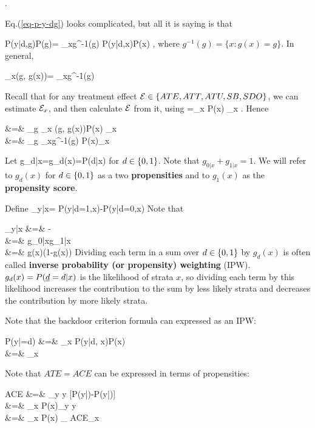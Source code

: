 \beq
{}
\;.
\label{eq-p-y-dg}
\eeq

Eq.(\ref{eq-p-y-dg}) 
looks complicated, but all
it is saying is that

\beq
P(y|d,g)P(g)=
\sum_{x\in g^{-1}(g)}
 P(y|d,x)P(x)
\;,
\eeq
where $g^{-1}(g)=
\{x: g(x)=g\}$.
In general,

\beq
\sum_x\delta(g, g(x))=
\sum_{x\in g^{-1}(g)}
\eeq



Recall that for any treatment
effect ${\cal E}
\in \{ATE, ATT,ATU, SB, SDO\}$, 
we can estimate ${\cal E}_x$,
and then calculate ${\cal E}$ from it, using
\beq
\cale=\sum_x P(x) \cale_x
\;.
\eeq
Hence

\beqa
\cale &=& \sum_g 
\sum_x \delta(g, g(x))P(x)
\cale_{x}
\\
&=&
\sum_g
\sum_{x\in g^{-1}(g)}
P(x)\cale_{x}
\eeqa


Let
\beq
g_{d|x}=g_d(x)=P(d|x)
\eeq
 for $d\in\{0,1\}$.
Note that $g_{0|x}+g_{1|x}=1$.
We will
refer to $g_d(x)$ 
for $d\in \{0,1\}$
as a two {\bf propensities}
and to $g_1(x)$ as the
{\bf propensity score}.

Define
\beq
\delta_{y|x}=
P(y|d=1,x)-P(y|d=0,x)
\eeq
Note that

\beqa
\delta_{y|x}
&=&
-
\\
&=&
{
g_{0|x}g_{1|x}
}
\\
&=&
{
g(x)(1-g(x))
}
\eeqa
Dividing
each term
in a sum over $d\in \{0,1\}$
by $g_ d(x)$ 
is often called
 {\bf inverse probability (or propensity)
weighting} (IPW).
$g_ d(x)=P({\underline{d}}= d|x)$ is the
likelihood of strata $x$,
so dividing each term by
this likelihood increases the
contribution to the sum
by less likely strata
and decreases the contribution by 
more likely strata.




Note that the 
backdoor criterion formula
can  expressed 
as an IPW:



\beqa
P(y|\rho\rvd=d)
&=&
\sum_x P(y|d, x)P(x)
\\
&=&
\sum_x 
\eeqa

Note that $ATE=ACE$ can be expressed
in terms of propensities:



\beqa
ACE
&=&
\sum_y y [P(y|\rho{})-P(y|\rho{})]
\\
&=&
\sum_x P(x)\sum_y y
\left[
P(y|d=1,x)
-
P(y|d=0,x)
\right]
\\&=&
\sum_x P(x)
_
{ACE_x}
\label{eq-ace-propensity}
\eeqa



